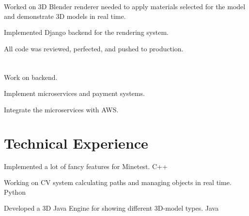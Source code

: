 \documentclass[]{deedy-resume-openfont}
\begin{document}
\section{{}}

\vspace{\topsep} %
\begin{tightemize}
\large
\item Worked on 3D Blender renderer needed to apply materials selected for the model and demonstrate 3D models in real time.
\item Implemented Django backend for the rendering system.
\item All code was reviewed, perfected, and pushed to production.
\end{tightemize}
\sectionsep


\section{{}}

\vspace{\topsep} %
\begin{tightemize}
\large
\item Work on \href{https://smiledirectclub.com}{{}} backend.
\item Implement microservices and payment systems.
\item Integrate the microservices with AWS.
\end{tightemize}
\sectionsep


\vspace{\topsep}
\begin{minipage}[t]{1\textwidth}
\section{Technical Experience}
\begin{tightemize}
\vspace{\topsep}
\large
\item Implemented a lot of fancy features for Minetest. C++
\item Working on CV system calculating paths and managing objects in real time. Python
\item Developed a 3D Java Engine for showing different 3D-model types. Java


\end{tightemize}
\sectionsep
\end{minipage}
\end{document}

